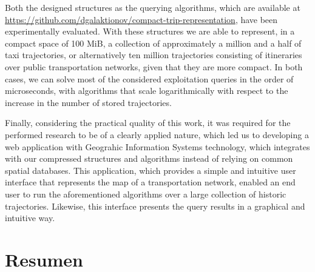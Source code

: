 Both the designed structures as the querying algorithms, which are available at \url{https://github.com/dgalaktionov/compact-trip-representation}, have been experimentally evaluated. With these structures we are able to represent, in a compact space of 100 MiB, a collection of approximately a million and a half of taxi trajectories, or alternatively ten million trajectories consisting of itineraries over public transportation networks, given that they are more compact. In both cases, we can solve most of the considered exploitation queries in the order of microseconds, with algorithms that scale logarithmically with respect to the increase in the number of stored trajectories.

Finally, considering the practical quality of this work, it was required for the performed research to be of a clearly applied nature, which led us to developing a web application with Geograhic Information Systems technology, which integrates with our compressed structures and algorithms instead of relying on common spatial databases. This application, which provides a simple and intuitive user interface that represents the map of a transportation network, enabled an end user to run the aforementioned algorithms over a large collection of historic trajectories. Likewise, this interface presents the query results in a graphical and intuitive way.

\chapter*{Resumen}

